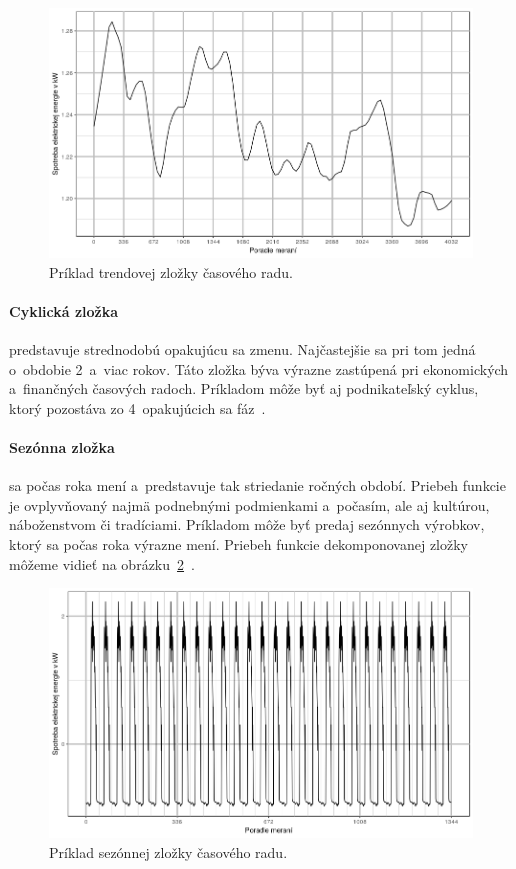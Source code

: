 \documentclass[a4paper,twoside,slovak,12pt,appendix]{article}
\begin{document}
\begin{figure}[H]
  \centering
  \includegraphics[width=\textwidth]{trend_component.png}
  \caption{Príklad trendovej zložky časového radu.}
  \label{fig:trend-component}
\end{figure}

\paragraph{Cyklická zložka} predstavuje strednodobú opakujúcu sa zmenu.
Najčastejšie sa pri tom jedná o~obdobie 2~a~viac rokov. Táto zložka býva výrazne
zastúpená pri ekonomických a~finančných časových radoch. Príkladom môže byť
aj podnikateľský cyklus, ktorý pozostáva zo 4~opakujúcich sa
fáz~\cite{Agrawal2013}.

\paragraph{Sezónna zložka} sa počas roka mení a~predstavuje tak striedanie
ročných období. Priebeh funkcie je ovplyvňovaný najmä podnebnými podmienkami
a~počasím, ale aj kultúrou, náboženstvom či tradíciami. Príkladom môže byť
predaj sezónnych výrobkov, ktorý sa počas roka výrazne mení. Priebeh funkcie
dekomponovanej zložky môžeme vidieť na
obrázku~\ref{fig:seasonal-component}~\cite{Agrawal2013}.

\begin{figure}[H]
  \centering
  \includegraphics[width=\textwidth]{season_component.png}
  \caption{Príklad sezónnej zložky časového radu.}
  \label{fig:seasonal-component}
\end{figure}
\end{document}
